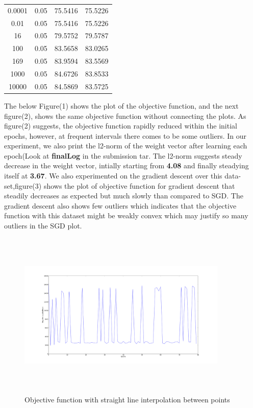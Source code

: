 \documentclass{article}
\begin{document}
\begin{longtable}{c|c|c|c}
 0.0001 &  0.05 & 75.5416 & 75.5226 \\
   0.01 &  0.05 & 75.5416 & 75.5226 \\
     16 &  0.05 & 79.5752 & 79.5787 \\
    100 &  0.05 & 83.5658 & 83.0265 \\
    169 &  0.05 & 83.9594 & 83.5569 \\
   1000 &  0.05 & 84.6726 & 83.8533 \\
  10000 &  0.05 & 84.5869 & 83.5725 \\ [1ex]
  \end{longtable}
  
  The below Figure(1) shows the plot of the objective function, and the next figure(2), shows the same objective function without connecting the plots. As figure(2) suggests, the objective function rapidly reduced within the initial epochs, however, at frequent intervals there comes to be some outliers. In our experiment, we also print the l2-norm of the weight vector after learning each epoch(Look at \textbf{finalLog} in the submission tar. The l2-norm suggests steady decrease in the weight vector, intially starting from \textbf{4.08} and finally steadying itself at \textbf{3.67}. We also experimented on the gradient descent over this data-set,figure(3) shows the plot of objective function for gradient descent that steadily decreases as expected but much slowly than compared to SGD. The gradient descent also shows few outliers which indicates that the objective function with this dataset might be weakly convex which may justify so many outliers in the SGD plot.  \newline
  \begin{figure}[H]
   \centering
  \includegraphics[width=10cm, height=8cm]{finalConnectedGraph}
  \caption{Objective function with straight line interpolation between points}
  \end{figure}
\end{document}
